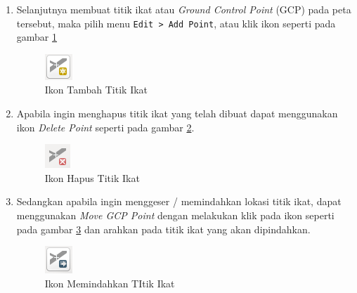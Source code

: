 \begin{enumerate}[1.]
  \item Selanjutnya membuat titik ikat atau \textit{Ground Control Point} (GCP) pada peta tersebut, maka pilih menu \verb|Edit > Add Point|, atau klik ikon seperti pada gambar \ref{fig:addpointicon}
  
  \begin{figure}[H]
    \centering
    \includegraphics[scale=1]{./resources/027-add-point-icon}
    \caption{Ikon Tambah Titik Ikat}
    \label{fig:addpointicon}
  \end{figure}
  
  \item Apabila ingin menghapus titik ikat yang telah dibuat dapat menggunakan ikon \textit{Delete Point} seperti pada gambar \ref{fig:deletepointicon}.
  
  \begin{figure}[H]
    \centering
    \includegraphics[scale=1]{./resources/028-delete-point-icon}
    \caption{Ikon Hapus Titik Ikat}
    \label{fig:deletepointicon}
  \end{figure}
  
  \item Sedangkan apabila ingin menggeser / memindahkan lokasi titik ikat, dapat menggunakan \textit{Move GCP Point} dengan melakukan klik pada ikon seperti pada gambar \ref{fig:movepointicon} dan arahkan pada titik ikat yang akan dipindahkan.
  
  \begin{figure}[H]
    \centering
    \includegraphics[scale=1]{./resources/029-move-point-icon}
    \caption{Ikon Memindahkan TItik Ikat}
    \label{fig:movepointicon}
  \end{figure}
  
\end{enumerate}